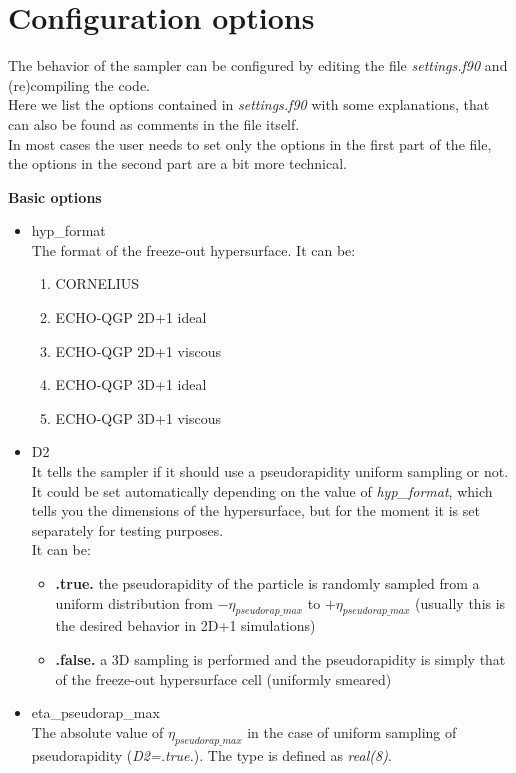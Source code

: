 \documentclass[12pt, a4paper]{report}
\begin{document}
\section{Configuration options}
The behavior of the sampler can be configured by editing the file \emph{settings.f90} and (re)compiling the code.\\
Here we list the options contained in \emph{settings.f90} with some explanations, that can also be found as comments in the file itself.\\
In most cases the user needs to set only the options in the first part of the file, the options in the second part are a bit more technical.\\
\begin{center}
    \textbf{Basic options}
\end{center}
\begin{itemize}
    \item {\color{ForestGreen}hyp\_format}\\
        The format of the freeze-out hypersurface. It can be:
        \begin{enumerate}
            \item CORNELIUS
            \item ECHO-QGP 2D+1 ideal
            \item ECHO-QGP 2D+1 viscous
            \item ECHO-QGP 3D+1 ideal
            \item ECHO-QGP 3D+1 viscous
        \end{enumerate}
    \item  {\color{ForestGreen}D2}\\
        It tells the sampler if it should use a pseudorapidity uniform sampling or not.\\
        It could be set automatically depending on the value of \emph{hyp\_format}, which tells you the dimensions of the hypersurface, but for the moment it is set separately for testing purposes.\\
        It can be:
        \begin{itemize}
            \item \textbf{.true.} the pseudorapidity of the particle is randomly sampled from a uniform distribution from $-\eta_{pseudorap\_max}$ to $+\eta_{pseudorap\_max}$ (usually this is the desired behavior in 2D+1 simulations)
            \item \textbf{.false.} a 3D sampling is performed and the pseudorapidity is simply that of the freeze-out hypersurface cell (uniformly smeared)
        \end{itemize}
    \item {\color{ForestGreen}eta\_pseudorap\_max}\\
         The absolute value of $\eta_{pseudorap\_max}$ in the case of uniform sampling of pseudorapidity (\emph{D2=.true.}). The type is defined as \emph{real(8)}.
\end{itemize}
\end{document}

